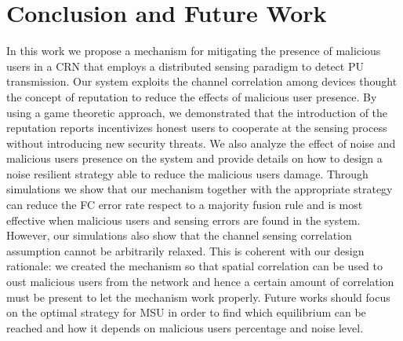 \documentclass[letterpaper, 10 pt, conference]{ieeeconf}  %
\begin{document}
\section{Conclusion and Future Work}
\label{sec5}
In this work we propose a mechanism for mitigating the presence of malicious users in a CRN that employs a distributed sensing paradigm to detect PU transmission. Our system exploits the channel correlation among devices thought the concept of reputation to reduce the effects of malicious user presence. By using a game theoretic approach, we demonstrated that the introduction of the reputation reports incentivizes honest users to cooperate at the sensing process without introducing new security threats. We also analyze the effect of noise and malicious users presence on the system and provide details on how to design a noise resilient strategy able to reduce the malicious users damage. Through simulations we show that our mechanism together with the appropriate strategy can reduce the FC error rate respect to a majority fusion rule and is most effective when malicious users and sensing errors are found in the system. However, our simulations also show that the channel sensing correlation assumption cannot be arbitrarily relaxed. This is coherent with our design rationale: we created the mechanism so that spatial correlation can be used to oust malicious users from the network and hence a certain amount of correlation must be present to let the mechanism work properly.
Future works should focus on the optimal strategy for MSU in order to find which equilibrium can be reached and how it depends on malicious users percentage and noise level. 


\addtolength{\textheight}{-12cm}   %




\end{document}

